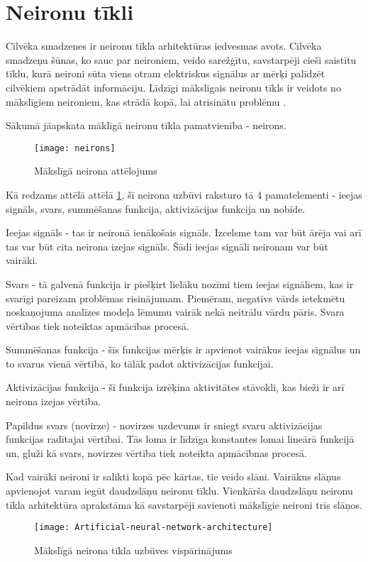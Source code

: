 \section{Neironu tīkli}
Cilvēka smadzenes ir neironu tīkla arhitektūras iedvesmas avots. Cilvēka smadzeņu šūnas, ko sauc par neironiem, veido sarežģītu, savstarpēji cieši saistītu tīklu, kurā neironi sūta viens otram elektriskus signālus ar mērķi palīdzēt cilvēkiem apstrādāt informāciju. Līdzīgi mākslīgais neironu tīkls ir veidots no mākslīgiem neironiem, kas strādā kopā, lai atrisinātu problēmu \cite{AwsNeuralNetworks}. 

Sākumā jāapskata māklīgā neironu tīkla pamatvienība - neirons.
\begin{figure}[H]
	\texttt{[image: neirons]}
	\caption{Mākslīgā neirona attēlojums}
	\label{fig:neirons}
\end{figure}

Kā redzams attēlā attēlā \ref{fig:neirons}, šī neirona uzbūvi raksturo tā 4 pamatelementi - ieejas signāls, svars, summēšanas funkcija, aktivizācijas funkcija un nobīde.

Ieejas signāls - tas ir neironā ienākošais signāls. Izcelsme tam var būt ārēja vai arī tas var būt cita neirona izejas signāls. Šādi ieejas signāli neironam var būt vairāki.

Svars - tā galvenā funkcija ir piešķirt lielāku nozīmi tiem ieejas signāliem, kas ir svarīgi pareizam problēmas risinājumam. Piemēram, negatīvs vārds ietekmētu noskaņojuma analīzes modeļa lēmumu vairāk nekā neitrālu vārdu pāris. Svara vērtības tiek noteiktas apmācības procesā.

Summēšanas funkcija - šīs funkcijas mērķis ir apvienot vairākus ieejas signālus un to svarus vienā vērtībā, ko tālāk padot aktivizācijas funkcijai.

Aktivizācijas funkcija - šī funkcija izrēķina aktivitātes stāvokli, kas bieži ir arī neirona izejas vērtība.	

Papildus svars (novirze) -  novirzes uzdevums ir sniegt svaru aktivizācijas funkcijas radītajai vērtībai. Tās loma ir līdzīga konstantes lomai lineārā funkcijā un, gluži kā svars, novirzes vērtība tiek noteikta apmācībnas procesā.

Kad vairāki neironi ir salikti kopā pēc kārtas, tie veido slāni. Vairākus slāņus apvienojot varam iegūt daudzslāņu neironu tīklu. Vienkārša daudzslāņu neironu tīkla arhitektūra aprakstāma kā savstarpēji savienoti mākslīgie neironi trīs slāņos.

\begin{figure}[H]
	\texttt{[image: Artificial-neural-network-architecture]}
	\caption{Mākslīgā neirona tīkla uzbūves vispārinājums \cite{artificialNeuralNetBre} }
	\label{fig:Artificial-neural-network-architecture}
\end{figure}

